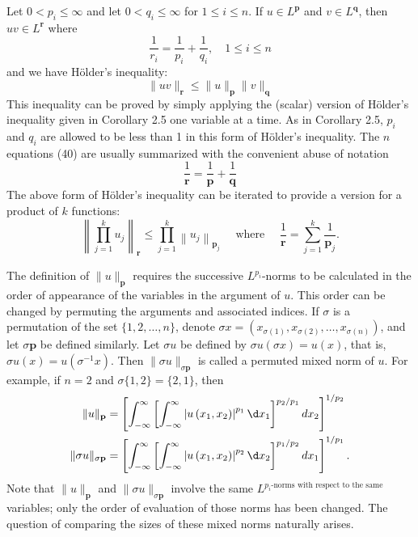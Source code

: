 \begin{para}
  Let $0<p_i \leq \infty$ and let $0<q_i \leq \infty$ for $1 \leq i \leq n$. If $u \in L^{\mathbf{p}}$ and $v \in L^{\mathbf{q}}$, then $u v \in L^{\mathbf{r}}$ where
  \[
  \frac{1}{r_i}=\frac{1}{p_i}+\frac{1}{q_i}, \quad 1 \leq i \leq n
  \]
  and we have Hölder's inequality:
  \[
  \|u v\|_{\mathbf{r}} \leq\|u\|_{\mathbf{p}}\|v\|_{\mathbf{q}}
  \]
  This inequality can be proved by simply applying the (scalar) version of Hölder's inequality given in Corollary 2.5 one variable at a time. As in Corollary 2.5, $p_i$ and $q_i$ are allowed to be less than 1 in this form of Hölder's inequality. The $n$ equations (40) are usually summarized with the convenient abuse of notation
  \[
  \frac{1}{\mathbf{r}}=\frac{1}{\mathbf{p}}+\frac{1}{\mathbf{q}}
  \]
  The above form of Hölder's inequality can be iterated to provide a version for a product of $k$ functions:
  \[
  \left\|\prod_{j=1}^k u_j\right\|_{\mathbf{r}} \leq \prod_{j=1}^k\left\|u_j\right\|_{\mathbf{p}_j} \quad \text { where } \quad \frac{1}{\mathbf{r}}=\sum_{j=1}^k \frac{1}{\mathbf{p}_j} .
  \]
\end{para}


\begin{para}
  The definition of $\|u\|_{\mathbf{p}}$ requires the successive $L^{p_i}$-norms to be calculated in the order of appearance of the variables in the argument of $u$. This order can be changed by permuting the arguments and associated indices. If $\sigma$ is a permutation of the set $\{1,2, \ldots, n\}$, denote $\sigma x=\left(x_{\sigma(1)}, x_{\sigma(2)}, \ldots, x_{\sigma(n)}\right)$, and let $\sigma \mathbf{p}$ be defined similarly. Let $\sigma u$ be defined by $\sigma u(\sigma x)=u(x)$, that is, $\sigma u(x)=u\left(\sigma^{-1} x\right)$. Then $\|\sigma u\|_{\sigma \mathbf{p}}$ is called a permuted mixed norm of $u$. For example, if $n=2$ and $\sigma\{1,2\}=\{2,1\}$, then
  \[
  \begin{aligned}
  \|u\|_{\mathbf{p}} & =\left[\int_{-\infty}^{\infty}\left[\int_{-\infty}^{\infty}\left|u\left(x_1, x_2\right)\right|^{p_1} \d x_1\right]^{p_2 / p_1} d x_2\right]^{1 / p_2} \\
  \|\sigma u\|_{\sigma \mathbf{p}} & =\left[\int_{-\infty}^{\infty}\left[\int_{-\infty}^{\infty}\left|u\left(x_1, x_2\right)\right|^{p_2} \d x_2\right]^{p_1 / p_2} d x_1\right]^{1 / p_1} .
  \end{aligned}
  \]
  Note that $\|u\|_{\mathbf{p}}$ and $\|\sigma u\|_{\sigma \mathbf{p}}$ involve the same $L^{p_i \text {-norms with respect to the same }}$ variables; only the order of evaluation of those norms has been changed. The question of comparing the sizes of these mixed norms naturally arises.
\end{para}



